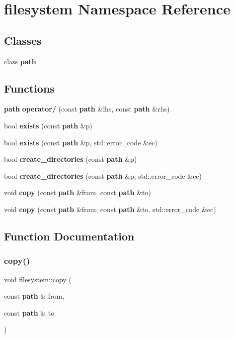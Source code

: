 \section{filesystem Namespace Reference}
\label{namespacefilesystem}
\subsection*{Classes}
\begin{DoxyCompactItemize}
\item 
class \textbf{ path}
\end{DoxyCompactItemize}
\subsection*{Functions}
\begin{DoxyCompactItemize}
\item 
\textbf{ path} \textbf{ operator/} (const \textbf{ path} \&lhs, const \textbf{ path} \&rhs)
\item 
bool \textbf{ exists} (const \textbf{ path} \&p)
\item 
bool \textbf{ exists} (const \textbf{ path} \&p, std\+::error\+\_\+code \&ec)
\item 
bool \textbf{ create\+\_\+directories} (const \textbf{ path} \&p)
\item 
bool \textbf{ create\+\_\+directories} (const \textbf{ path} \&p, std\+::error\+\_\+code \&ec)
\item 
void \textbf{ copy} (const \textbf{ path} \&from, const \textbf{ path} \&to)
\item 
void \textbf{ copy} (const \textbf{ path} \&from, const \textbf{ path} \&to, std\+::error\+\_\+code \&ec)
\end{DoxyCompactItemize}


\subsection{Function Documentation}
\mbox{\label{namespacefilesystem_a2c036bcc7d47af04cc1369fabf16e9db}} 
\subsubsection{copy()\hspace{0.1cm}{\footnotesize\ttfamily [1/2]}}
{\footnotesize\ttfamily void filesystem\+::copy (\begin{DoxyParamCaption}\item[{const \textbf{ path} \&}]{from,  }\item[{const \textbf{ path} \&}]{to }\end{DoxyParamCaption})}



